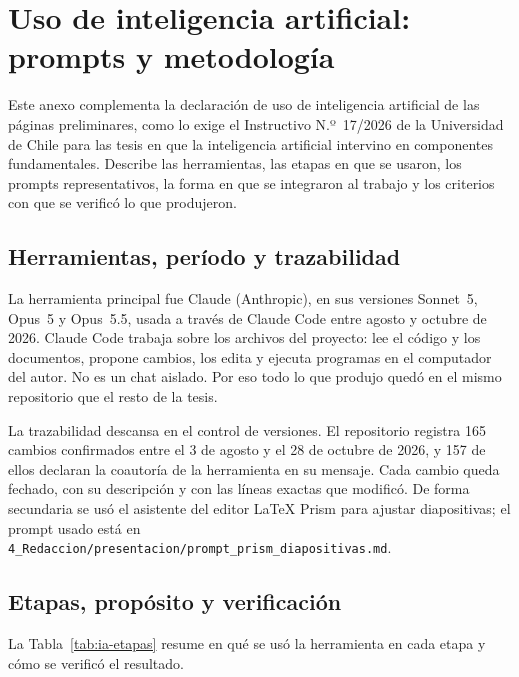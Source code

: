 \chapter{Uso de inteligencia artificial: prompts y metodología}
\label{chap:anexoIA}

\noindent Este anexo complementa la declaración de uso de inteligencia artificial de las páginas preliminares, como lo exige el Instructivo N.º~17/2026 de la Universidad de Chile para las tesis en que la inteligencia artificial intervino en componentes fundamentales. Describe las herramientas, las etapas en que se usaron, los prompts representativos, la forma en que se integraron al trabajo y los criterios con que se verificó lo que produjeron.

\section{Herramientas, período y trazabilidad}

La herramienta principal fue Claude (Anthropic), en sus versiones Sonnet~5, Opus~5 y Opus~5.5, usada a través de Claude Code entre agosto y octubre de 2026. Claude Code trabaja sobre los archivos del proyecto: lee el código y los documentos, propone cambios, los edita y ejecuta programas en el computador del autor. No es un chat aislado. Por eso todo lo que produjo quedó en el mismo repositorio que el resto de la tesis.

La trazabilidad descansa en el control de versiones. El repositorio registra 165 cambios confirmados entre el 3 de agosto y el 28 de octubre de 2026, y 157 de ellos declaran la coautoría de la herramienta en su mensaje. Cada cambio queda fechado, con su descripción y con las líneas exactas que modificó. De forma secundaria se usó el asistente del editor \LaTeX{} Prism para ajustar diapositivas; el prompt usado está en \texttt{4\_Redaccion/presentacion/prompt\_prism\_diapositivas.md}.

\section{Etapas, propósito y verificación}

La Tabla~\ref{tab:ia-etapas} resume en qué se usó la herramienta en cada etapa y cómo se verificó el resultado.

